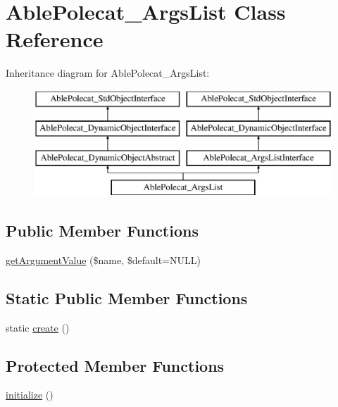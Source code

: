 \hypertarget{class_able_polecat___args_list}{}\section{Able\+Polecat\+\_\+\+Args\+List Class Reference}
\label{class_able_polecat___args_list}
Inheritance diagram for Able\+Polecat\+\_\+\+Args\+List\+:\begin{figure}[H]
\begin{center}
\leavevmode
\includegraphics[height=4.000000cm]{class_able_polecat___args_list}
\end{center}
\end{figure}
\subsection*{Public Member Functions}
\begin{DoxyCompactItemize}
\item 
\hyperlink{class_able_polecat___args_list_a8dd5546ffc7409353ee2d0fa82e20e75}{get\+Argument\+Value} (\$name, \$default=N\+U\+L\+L)
\end{DoxyCompactItemize}
\subsection*{Static Public Member Functions}
\begin{DoxyCompactItemize}
\item 
static \hyperlink{class_able_polecat___args_list_a239b1c70258014a86569483c2d009de6}{create} ()
\end{DoxyCompactItemize}
\subsection*{Protected Member Functions}
\begin{DoxyCompactItemize}
\item 
\hyperlink{class_able_polecat___args_list_a91098fa7d1917ce4833f284bbef12627}{initialize} ()
\end{DoxyCompactItemize}


